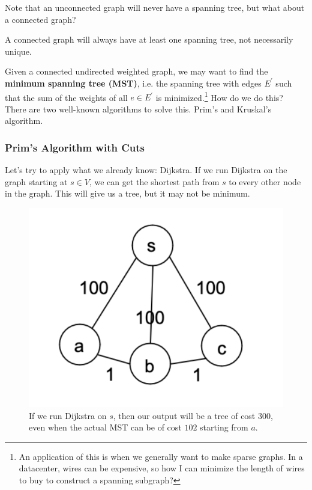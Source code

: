 \documentclass{article}
\begin{document}
      Note that an unconnected graph will never have a spanning tree, but what about a connected graph? 

      \begin{theorem}
        A connected graph will always have at least one spanning tree, not necessarily unique. 
      \end{theorem}

      Given a connected undirected weighted graph, we may want to find the \textbf{minimum spanning tree (MST)}, i.e. the spanning tree with edges $E^\prime$ such that the sum of the weights of all $e \in E^\prime$ is minimized.\footnote{An application of this is when we generally want to make sparse graphs. In a datacenter, wires can be expensive, so how I can minimize the length of wires to buy to construct a spanning subgraph?} How do we do this? There are two well-known algorithms to solve this. Prim's and Kruskal's algorithm.  
    
    \subsubsection{Prim's Algorithm with Cuts}

      Let's try to apply what we already know: Dijkstra. If we run Dijkstra on the graph starting at $s \in V$, we can get the shortest path from $s$ to every other node in the graph. This will give us a tree, but it may not be minimum. 

      \begin{figure}[H]
        \centering 
        \includegraphics[scale=0.6]{img/dik_mst_prob.png}
        \caption{If we run Dijkstra on $s$, then our output will be a tree of cost $300$, even when the actual MST can be of cost $102$ starting from $a$.} 
        \label{fig:dik_mst_prob}
      \end{figure}
\end{document}
